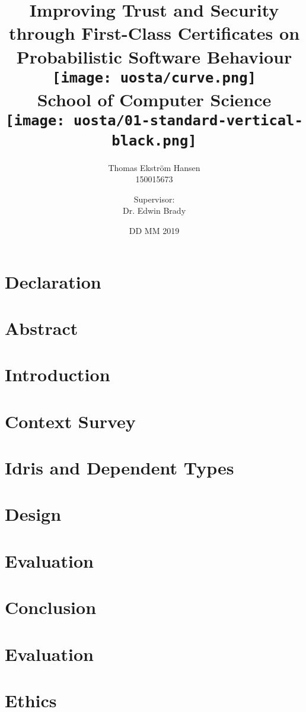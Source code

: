 \documentclass[12pt]{report}
\title{
    {Improving Trust and Security through First-Class Certificates on Probabilistic Software Behaviour}\\
    \vspace{1.5cm}
    {\texttt{[image: uosta/curve.png]}}\\
    {\fontfamily{ppl}\selectfont\large School of Computer Science}\\
    \vspace{-0.8cm}
    {\texttt{[image: uosta/01-standard-vertical-black.png]}}\\
    \vspace{-2cm}
}
\author{
    {Thomas Ekstr{\" o}m Hansen}\\
    {150015673}
    \and
    {Supervisor:}\\
    {Dr. Edwin Brady}
}
\date{DD MM 2019}
\begin{document}
    \maketitle
    
    \chapter*{Declaration}
    
    
    \chapter*{Abstract}
    
    
    \tableofcontents
    
    \chapter{Introduction}
    
    
    \chapter{Context Survey}
    
    
    \chapter{Idris and Dependent Types}
    
        
    \chapter{Design}
    
    
    \chapter{Evaluation}
    
        
    \chapter{Conclusion}
    
    
    
    
    
    \appendix
    
    \chapter{Evaluation}\label{app:evaln}
    
    
    \chapter{Ethics}
    
\end{document}
